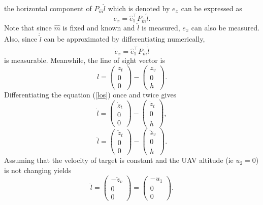 the horizontal component of $P_{\hat{m}}\hat{l}$ which is denoted by $e_x$ can be expressed as
\begin{equation}
e_x=\hat{e}_1^{\top}P_{\hat{m}}\hat{l}.
\end{equation}
Note that since $\hat{m}$ is fixed and known and $\hat{l}$ is measured, $e_x$ can also be measured. Also, since $\dot{\hat{l}}$ can be approximated by differentiating numerically,
\begin{equation}
\dot{e}_x=\hat{e}_1^{\top}P_{\hat{m}}\dot{\hat{l}}
\label{exdot}
\end{equation} is measurable.
Meanwhile, the line of sight vector is
\begin{equation}
l=\begin{pmatrix} z_t \\ 0 \\ 0 \end{pmatrix}
-\begin{pmatrix} z_v \\ 0 \\ h \end{pmatrix}.
\label{los}
\end{equation}
Differentiating the equation (\ref{los}) once and twice gives 
\begin{equation}
\dot{l}=\begin{pmatrix} \dot{z}_t \\ 0 \\ 0 \end{pmatrix}
-\begin{pmatrix} \dot{z}_t \\ 0 \\ \dot{h} \end{pmatrix},
\end{equation}
\begin{equation}
\ddot{l}=\begin{pmatrix} \ddot{z}_t \\ 0 \\ 0 \end{pmatrix}
-\begin{pmatrix} \ddot{z}_v \\ 0 \\ \ddot{h} \end{pmatrix}.
\end{equation}
Assuming that the velocity of target is constant and the UAV altitude (ie $u_2=0$) is not changing yields
\begin{equation}
\ddot{l}=\begin{pmatrix} -\ddot{z}_v \\ 0 \\ 0 \end{pmatrix}
=\begin{pmatrix} -u_1 \\ 0 \\ 0 \end{pmatrix}.
\label{lddot}
\end{equation}
